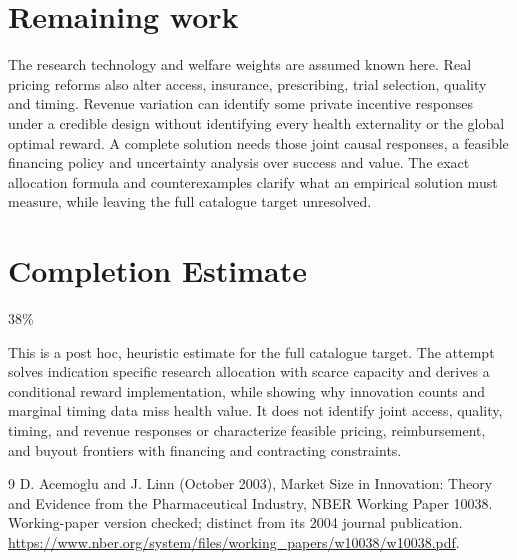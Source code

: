 \documentclass[11pt]{article}
\begin{document}
\section*{Remaining work}
The research technology and welfare weights are assumed known here. Real pricing reforms also alter access, insurance, prescribing, trial selection, quality and timing. Revenue variation can identify some private incentive responses under a credible design without identifying every health externality or the global optimal reward. A complete solution needs those joint causal responses, a feasible financing policy and uncertainty analysis over success and value. The exact allocation formula and counterexamples clarify what an empirical solution must measure, while leaving the full catalogue target unresolved.

\section{Completion Estimate}
38\%

This is a post hoc, heuristic estimate for the full catalogue target.
The attempt solves indication specific research allocation with scarce capacity and derives a conditional reward implementation, while showing why innovation counts and marginal timing data miss health value. It does not identify joint access, quality, timing, and revenue responses or characterize feasible pricing, reimbursement, and buyout frontiers with financing and contracting constraints.

\begin{thebibliography}{9}
 D. Acemoglu and J. Linn (October 2003), Market Size in Innovation: Theory and Evidence from the Pharmaceutical Industry, NBER Working Paper 10038. Working-paper version checked; distinct from its 2004 journal publication.
\url{https://www.nber.org/system/files/working_papers/w10038/w10038.pdf}.
\end{thebibliography}
\end{document}
